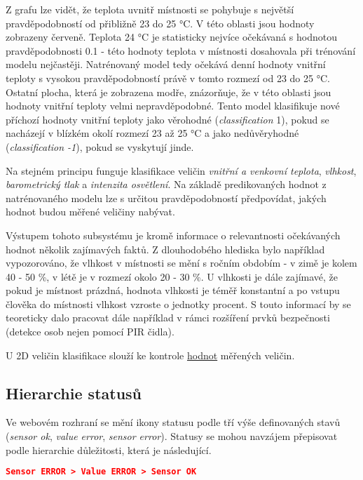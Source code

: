 Z grafu lze vidět, že teplota uvnitř místnosti se pohybuje s největší pravděpodobností od přibližně 23 do 25 \si{\degree}C. V této oblasti jsou hodnoty zobrazeny červeně. Teplota 24 \si{\degree}C je statisticky nejvíce očekávaná s hodnotou pravděpodobnosti 0.1 - této hodnoty teplota v místnosti dosahovala při trénování modelu nejčastěji. Natrénovaný model tedy očekává denní hodnoty vnitřní teploty s vysokou pravděpodobností právě v tomto rozmezí od 23 do 25 \si{\degree}C. Ostatní plocha, která je zobrazena modře, znázorňuje, že v této oblasti jsou hodnoty vnitřní teploty velmi nepravděpodobné. Tento model klasifikuje nové příchozí hodnoty vnitřní teploty jako věrohodné (\textit{classification} 1), pokud se nacházejí v blízkém okolí rozmezí 23 až 25 \si{\degree}C a jako nedůvěryhodné (\textit{classification -1}), pokud se vyskytují jinde. \par
Na stejném principu funguje klasifikace veličin \textit{vnitřní a venkovní teplota}, \textit{vlhkost}, \textit{barometrický tlak} a \textit{intenzita osvětlení}. Na základě predikovaných hodnot z natrénovaného modelu lze s určitou pravděpodobností předpovídat, jakých hodnot budou měřené veličiny nabývat. \par
Výstupem tohoto subsystému je kromě informace o relevantnosti očekávaných hodnot několik zajímavých faktů. Z dlouhodobého hlediska bylo například vypozorováno, že vlhkost v místnosti se mění s ročním obdobím - v zimě je kolem 40 - 50 \%, v létě je v rozmezí okolo 20 - 30 \%. U vlhkosti je dále zajímavé, že pokud je místnost prázdná, hodnota vlhkosti je téměř konstantní a po vstupu člověka do místnosti vlhkost vzroste o jednotky procent. S touto informací by se teoreticky dalo pracovat dále například v rámci rozšíření prvků bezpečnosti (detekce osob nejen pomocí PIR čidla). \par
U 2D veličin klasifikace slouží ke kontrole \underline{hodnot} měřených veličin. 

\subsection*{Hierarchie statusů}
Ve webovém rozhraní se mění ikony statusu podle tří výše definovaných stavů (\textit{sensor ok}, \textit{value error}, \textit{sensor error}). Statusy se mohou navzájem přepisovat podle hierarchie důležitosti, která je následující.  \par

\begin{lstlisting}[language=json]
	   Sensor ERROR > Value ERROR > Sensor OK
\end{lstlisting}

